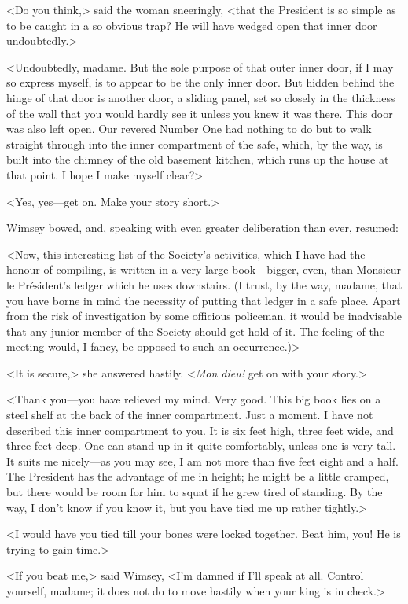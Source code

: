 <Do you think,> said the woman sneeringly, <that the President is so simple as to be caught in a so obvious trap? He will have wedged open that inner door undoubtedly.>

<Undoubtedly, madame. But the sole purpose of that outer inner door, if I may so express myself, is to appear to be the only inner door. But hidden behind the hinge of that door is another door, a sliding panel, set so closely in the thickness of the wall that you would hardly see it unless you knew it was there. This door was also left open. Our revered Number One had nothing to do but to walk straight through into the inner compartment of the safe, which, by the way, is built into the chimney of the old basement kitchen, which runs up the house at that point. I hope I make myself clear?>

<Yes, yes—get on. Make your story short.>

Wimsey bowed, and, speaking with even greater deliberation than ever, resumed:

<Now, this interesting list of the Society's activities, which I have had the honour of compiling, is written in a very large book—bigger, even, than Monsieur le Président's ledger which he uses downstairs. (I trust, by the way, madame, that you have borne in mind the necessity of putting that ledger in a safe place. Apart from the risk of investigation by some officious policeman, it would be inadvisable that any junior member of the Society should get hold of it. The feeling of the meeting would, I fancy, be opposed to such an occurrence.)>

<It is secure,> she answered hastily. <\textit{Mon dieu!} get on with your story.>

<Thank you—you have relieved my mind. Very good. This big book lies on a steel shelf at the back of the inner compartment. Just a moment. I have not described this inner compartment to you. It is six feet high, three feet wide, and three feet deep. One can stand up in it quite comfortably, unless one is very tall. It suits me nicely—as you may see, I am not more than five feet eight and a half. The President has the advantage of me in height; he might be a little cramped, but there would be room for him to squat if he grew tired of standing. By the way, I don't know if you know it, but you have tied me up rather tightly.>

<I would have you tied till your bones were locked together. Beat him, you! He is trying to gain time.>

<If you beat me,> said Wimsey, <I'm damned if I'll speak at all. Control yourself, madame; it does not do to move hastily when your king is in check.>

